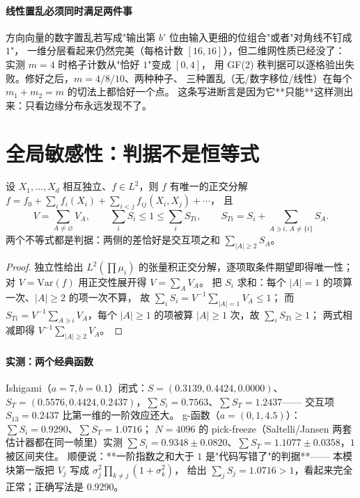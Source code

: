 \paragraph{线性置乱必须同时满足两件事}
方向向量的数字置乱若写成"输出第 $b'$ 位由输入更细的位组合"或者"对角线不钉成 $1$"，
一维分层看起来仍然完美（每格计数 $[16,16]$），但二维网性质已经没了：
实测 $m=4$ 时格子计数从"恰好 $1$"变成 $[0,4]$，
用 GF(2) 秩判据可以逐格验出失败。修好之后，$m=4/8/10$、两种种子、
三种置乱（无/数字移位/线性）在每个 $m_1+m_2=m$ 的切法上都恰好一个点。
这条写进断言是因为它**只能**这样测出来：只看边缘分布永远发现不了。

\section{全局敏感性：判据不是恒等式}\label{sec:sobol}

\begin{theorem}\label{thm:sobol}
设 $X_1,\dots,X_d$ 相互独立、$f\in L^2$，则 $f$ 有唯一的正交分解
$f=f_0+\sum_i f_i(X_i)+\sum_{i<j}f_{ij}(X_i,X_j)+\cdots$，
且
\[
  V=\sum_{A\ne\varnothing}V_A,\qquad
  \sum_i S_i\le1\le\sum_i S_{Ti},\qquad
  S_{Ti}=S_i+\sum_{A\ni i,\,A\ne\{i\}}S_A .
\]
两个不等式都是判据：两侧的差恰好是交互项之和
$\sum_{\lvert A\rvert\ge2}S_A$。
\end{theorem}

\begin{proof}
独立性给出 $L^2(\prod\mu_i)$ 的张量积正交分解，逐项取条件期望即得唯一性；
对 $V=\mathrm{Var}(f)$ 用正交性展开得 $V=\sum_A V_A$。
把 $S_i$ 求和：每个 $\lvert A\rvert=1$ 的项算一次、$\lvert A\rvert\ge2$ 的项一次不算，
故 $\sum_iS_i=V^{-1}\sum_{\lvert A\rvert=1}V_A\le1$；
而 $S_{Ti}=V^{-1}\sum_{A\ni i}V_A$，每个 $\lvert A\rvert\ge1$ 的项被算
$\lvert A\rvert\ge1$ 次，故 $\sum_iS_{Ti}\ge1$；
两式相减即得 $V^{-1}\sum_{\lvert A\rvert\ge2}V_A$。
\end{proof}

\paragraph{实测：两个经典函数}
Ishigami（$a=7,b=0.1$）闭式：$S=(0.3139,0.4424,0.0000)$、
$S_T=(0.5576,0.4424,0.2437)$，$\sum S_i=0.7563$、$\sum S_T=1.2437$——
交互项 $S_{13}=0.2437$ 比第一维的一阶效应还大。
g-函数（$a=(0,1,4.5)$）：$\sum S_i=0.9290$、$\sum S_T=1.0716$；
$N=4096$ 的 pick-freeze（Saltelli/Jansen 两套估计器都在同一帧里）实测
$\sum S_i=0.9348\pm0.0820$、$\sum S_T=1.1077\pm0.0358$，$1$ 被区间夹住。
顺便说：**一阶指数之和大于 $1$ 是"代码写错了"的判据**——
本模块第一版把 $V_j$ 写成 $\sigma_j^2\prod_{k\ne j}(1+\sigma_k^2)$，
给出 $\sum_jS_j=1.0716>1$，看起来完全正常；正确写法是 $0.9290$。

